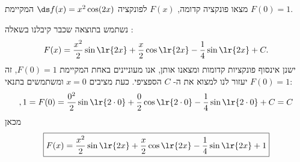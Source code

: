 מצאו פונקציה קדומה, $F(x)$ לפונקציה $\ds f(x)=x^2\cos(2x)$ המקיימת $F(0)=1$.
\begin{solbox}
נשתמש בתוצאה שכבר קיבלנו בשאלה
:
\begin{align*}
F(x)=\frac{x^2}{2}\sin\lr{2x}+\frac{x}{2}\cos\lr{2x}-\frac14\sin\lr{2x}+C.
\end{align*}
ישנן אינסוף פונקציות קדומות ומצאנו אותן, אנו מעוניינים באחת המקיימת
$F(0)=1$,
זה יעזור לנו למצוא את ה-
$C$
הספציפי.
כעת מציבים $x=0$ ומשתמשים בתנאי $F(0)=1$:
$$,1=F(0)=\frac{0^2}{2}\sin\lr{2\cdot0}+\frac{0}{2}\cos\lr{2\cdot0}-\frac14\sin\lr{2\cdot0}+C=C$$
מכאן
\begin{align*}
\boxed{F(x)=\frac{x^2}{2}\sin\lr{2x}+\frac{x}{2}\cos\lr{2x}-\frac14\sin\lr{2x}+1}
\end{align*}

%
\end{solbox}
